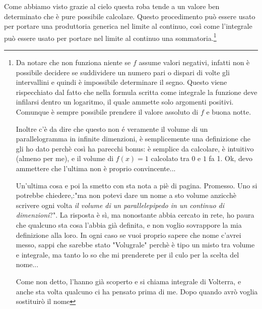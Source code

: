 \documentclass[11pt,a4paper]{report}
\theoremstyle{definition}
\theoremstyle{plain}
\theoremstyle{plain}
\begin{document}
			Come abbiamo visto grazie al cielo questa roba tende a un valore ben determinato che è pure possibile calcolare. Questo procedimento può essere usato per portare una produttoria generica nel limite al continuo, così come l'integrale può essere usato per portare nel limite al continuo una sommatoria.\footnote{
				Da notare che non funziona niente se $f$ assume valori negativi, infatti non è possibile decidere se suddividere un numero pari o dispari di volte gli intervallini e quindi è impossibile determinare il segno.
				\newline Questo viene rispecchiato dal fatto che nella formula scritta come integrale la funzione deve infilarsi dentro un logaritmo, il quale ammette solo argomenti positivi.
				\newline Comunque è sempre possibile prendere il valore assoluto di $f$ e buona notte.\newline

				Inoltre c'è da dire che questo non é veramente il volume di un parallelogramma in infinite dimenzioni, è semplicemente una definizione che gli ho dato perchè così ha parecchi bonus: è semplice da calcolare, è intuitivo (almeno per me), e il volume di $f(x)=1$ calcolato tra $0$ e $1$ fa 1. Ok, devo ammettere che l'ultima non è proprio convincente...\newline

				Un'ultima cosa e poi la smetto con sta nota a piè di pagina. Promesso.\newline
				Uno si potrebbe chiedere,:"ma non potevi dare un nome a sto volume anzicchè scrivere ogni volta \emph{il volume di un parallelepipedo in un continuo di dimenzioni}?". La risposta è sì, ma nonostante abbia cercato in rete, ho paura che qualcuno sta cosa l'abbia già definita, e non voglio sovrappore la mia definizione alla loro. In ogni caso se vuoi proprio sapere che nome c'avrei messo, sappi che sarebbe stato "Volugrale" perchè è tipo un misto tra volume e integrale, ma tanto lo so che mi prenderete per il culo per la scelta del nome...\newline

				Come non detto, l'hanno già scoperto e si chiama integrale di Volterra, e anche sta volta qualcuno ci ha pensato prima di me. Dopo quando avrò voglia sostituirò il nome}
\end{document}
